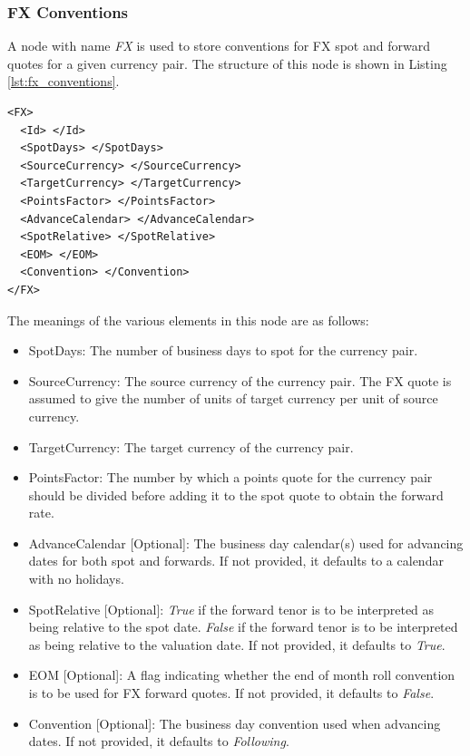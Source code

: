 \subsubsection{FX Conventions}\label{sss:fx_convention}
A node with name \emph{FX} is used to store conventions for FX spot and forward quotes for a given currency pair. The
structure of this node is shown in Listing \ref{lst:fx_conventions}.

\begin{listing}[H]
\begin{verbatim}
<FX>
  <Id> </Id>
  <SpotDays> </SpotDays>
  <SourceCurrency> </SourceCurrency>
  <TargetCurrency> </TargetCurrency>
  <PointsFactor> </PointsFactor>
  <AdvanceCalendar> </AdvanceCalendar>
  <SpotRelative> </SpotRelative>
  <EOM> </EOM>
  <Convention> </Convention>
</FX>
\end{verbatim}
\caption{FX conventions}
\label{lst:fx_conventions}
\end{listing}


The meanings of the various elements in this node are as follows:
\begin{itemize}
\item SpotDays: The number of business days to spot for the currency pair.
\item SourceCurrency: The source currency of the currency pair. The FX quote is assumed to give the number of units of
target currency per unit of source currency.
\item TargetCurrency: The target currency of the currency pair.
\item PointsFactor: The number by which a points quote for the currency pair should be divided before adding it to the
spot quote to obtain the forward rate.
\item AdvanceCalendar [Optional]: The business day calendar(s) used for advancing dates for both spot and forwards. If
not provided, it defaults to a calendar with no holidays.
\item SpotRelative [Optional]: \emph{True} if the forward tenor is to be interpreted as being relative to the spot date.
\emph{False} if the forward tenor is to be interpreted as being relative to the valuation date. If not provided, it
defaults to \emph{True}.
\item EOM [Optional]: A flag indicating whether the end of month roll convention is to be used for FX forward quotes. If not provided, it defaults to \emph{False}.
\item Convention [Optional]: The business day convention used when advancing dates. If not provided, it defaults to \emph{Following}.
\end{itemize}

